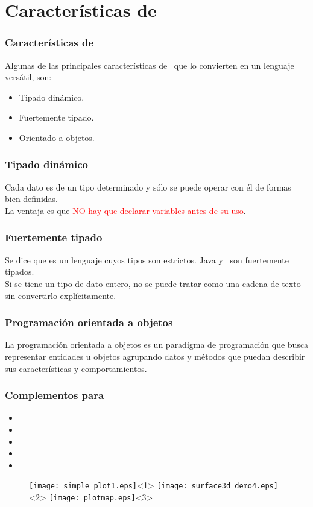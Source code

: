 \section{Características de \python}
\begin{frame}
\frametitle{Características de \python}
Algunas de las principales características de \python\ que lo convierten en un lenguaje versátil, son:
\begin{itemize}
\item Tipado dinámico.
\item Fuertemente tipado.
\item Orientado a objetos.
\end{itemize}
\end{frame}
\begin{frame}
\frametitle{Tipado dinámico}
Cada dato es de un tipo determinado y sólo se puede operar con él de formas bien definidas.
\\
\bigskip
La ventaja es que \textcolor{red}{NO hay que declarar variables antes de su uso}.
\end{frame}
\begin{frame}
\frametitle{Fuertemente tipado}
Se dice que es un lenguaje cuyos tipos son estrictos. Java y \python\ son fuertemente tipados.
\\
\bigskip
Si se tiene un tipo de dato entero, no se puede tratar como una cadena de texto sin convertirlo explícitamente.
\end{frame}
\begin{frame}
\frametitle{Programación orientada a objetos}
La programación orientada a objetos es un paradigma de programación que busca representar entidades u objetos agrupando datos y métodos que puedan describir sus características y comportamientos.
\end{frame}
\begin{frame}[fragile]
\frametitle{Complementos para \python}
\begin{itemize}[<+->]
\item {}
\item {}
\item {}
\item {}
\item {}
\end{itemize}
\end{frame}
\begin{frame}
\begin{figure}
	\centering
	\texttt{[image: simple\_plot1.eps]}<1> 
	\texttt{[image: surface3d\_demo4.eps]}<2>
	\texttt{[image: plotmap.eps]}<3>
\end{figure}
\end{frame}
